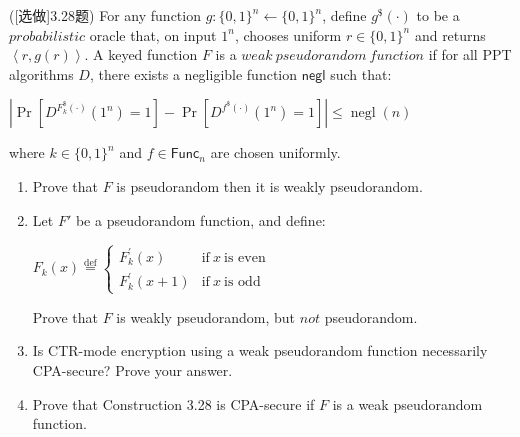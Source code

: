 \begin{questions}
    \question ([选做]3.28题) For any function $g:\{0,1\}^n\leftarrow\{0,1\}^n$, define $g^\text{\$}(\cdot)$ to be a $probabilistic$ oracle that, on input $1^n$, chooses uniform $r\in\{0,1\}^n$ and returns $\left\langle{r,g(r)}\right\rangle$. A keyed function $F$ is a $weak\ pseudorandom\ function$ if for all PPT algorithms $D$, there exists a negligible function $\textsf{negl}$ such that:

        \begin{center}
            $\left|\operatorname{Pr}\left[D^{F_k^\$(\cdot)}\left(1^n\right)=1\right]-\operatorname{Pr}\left[D^{f^\$(\cdot)}\left(1^n\right)=1\right]\right|\leq\operatorname{negl}(n)$
        \end{center}

        where $k\in\{0,1\}^n$ and $f\in\textsf{Func}_n$ are chosen uniformly.

        \begin{enumerate}
            \item Prove that $F$ is pseudorandom then it is weakly pseudorandom.
            \item Let $F'$ be a pseudorandom function, and define:
                \begin{center}
                    $F_k(x)\stackrel{\text{def}}{=}\left\{\begin{array}{cl}F_k^{\prime}(x)&\text{if}\ x\ \text{is even}\\F_k^{\prime}(x+1)&\text{if}\ x\ \text{is odd}\end{array}\right.$
                \end{center}
                Prove that $F$ is weakly pseudorandom, but $not$ pseudorandom.
            \item Is CTR-mode encryption using a weak pseudorandom function necessarily CPA-secure? Prove your answer.
            \item Prove that Construction 3.28 is CPA-secure if $F$ is a weak pseudorandom function.
        \end{enumerate}


\end{questions}
